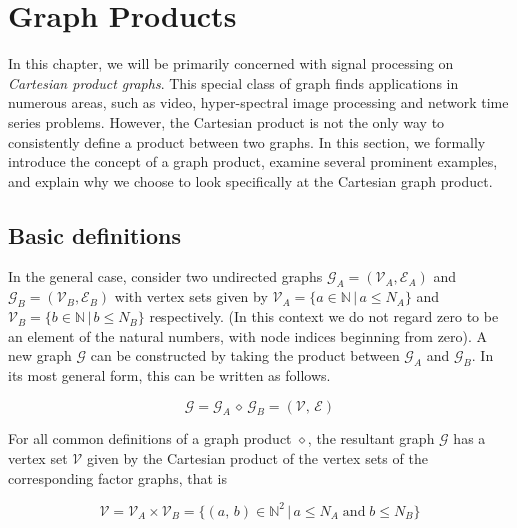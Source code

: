 \section{Graph Products}

\label{sec:reg_and_rec_intro}

In this chapter, we will be primarily concerned with signal processing on \textit{Cartesian product graphs}. This special class of graph finds applications in numerous areas, such as video, hyper-spectral image processing and network time series problems. However, the Cartesian product is not the only way to consistently define a product between two graphs. In this section, we formally introduce the concept of a graph product, examine several prominent examples, and explain why we choose to look specifically at the Cartesian graph product.

\subsection{Basic definitions}

\label{sec:graph_products_defined}

In the general case, consider two undirected graphs $\mathcal{G}_A = (\mathcal{V}_A, \mathcal{E}_A)$ and $\mathcal{G}_B = (\mathcal{V}_B, \mathcal{E}_B)$ with vertex sets given by $\mathcal{V}_A = \{a \in \mathbb{N} \, | \, a \leq N_A \}$ and $\mathcal{V}_B = \{b \in \mathbb{N} \, | \, b \leq N_B \}$ respectively. (In this context we do not regard zero to be an element of the natural numbers, with node indices beginning from zero). A new graph $\mathcal{G}$ can be constructed by taking the product between $\mathcal{G}_A$ and $\mathcal{G}_B$. In its most general form, this can be written as follows.

\begin{equation}
    \mathcal{G} = \mathcal{G}_A \, \diamond \, \mathcal{G}_B = (\mathcal{V}, \, \mathcal{E})
\end{equation}

For all common definitions of a graph product $\diamond$, the resultant graph $\mathcal{G}$ has a vertex set $\mathcal{V}$ given by the Cartesian product of the vertex sets of the corresponding factor graphs, that is

\begin{equation}
    \mathcal{V} = \mathcal{V}_A \times \mathcal{V}_B = \{(a, \, b) \in \mathbb{N}^2 \, | \, a \leq N_A \; \text{and} \; b \leq N_B \}
\end{equation}

